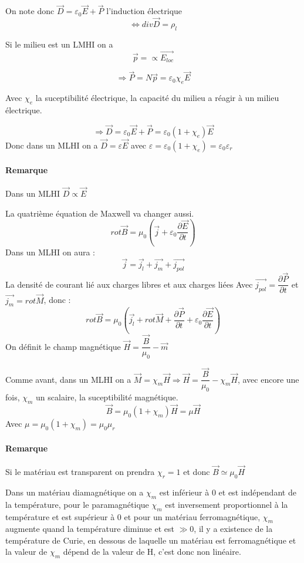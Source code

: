\documentclass[12pt,a4paper]{report}
\begin{document}
On note donc \(\vec{D} = \varepsilon_0 \vec{E} + \vec{P}\) l'induction électrique 
\[
	\Leftrightarrow div \vec{D} = \rho_l
\]

Si le milieu est un LMHI on a 
\[
	\vec{p} = \propto \vec{E_{loc}}
\]

\[
	\Rightarrow \vec{P} = N \vec{p} = \varepsilon_0 \chi_e \vec{E}
\]

Avec \(\chi_e\) la suceptibilité électrique, la capacité du milieu a réagir à un milieu électrique.

\[
	\Rightarrow \vec{D} = \varepsilon_0 \vec{E} + \vec{P} = \varepsilon_0 (1 + \chi_e) \vec{E}
\]
Donc dans un MLHI on a \(\vec{D} = \varepsilon \vec{E}\) avec \(\varepsilon = \varepsilon_0 (1+\chi_e) = \varepsilon_0 \varepsilon_r\)

\paragraph{Remarque} Dans un MLHI \(\vec{D} \propto \vec{E}\)

La quatrième équation de Maxwell va changer aussi.
\[
	rot \vec{B} = \mu_0 \left( \vec{j} + \varepsilon_0 \dfrac{\partial \vec{E}}{\partial t}\right)
\]
Dans un MLHI on aura :
\[
	\vec{j} = \vec{j_l} + \vec{j_m} + \vec{j_{pol}}
\]
La densité de courant lié aux charges libres et aux charges liées
Avec \(\vec{j_{pol}} = \dfrac{\partial \vec{P}}{\partial t}\) et \(\vec{j_m} = rot \vec{M}\), donc :
\[
	rot \vec{B} = \mu_0 \left( \vec{j_l} + rot \vec{M} + \dfrac{\partial \vec{P}}{\partial t} + \varepsilon_0 \dfrac{\partial \vec{E}}{\partial t}\right)
\]
On définit le champ magnétique \(\vec{H} = \dfrac{\vec{B}}{\mu_0} - \vec{m}\)

Comme avant, dans un MLHI on a \(\vec{M} = \chi_m \vec{H} \Rightarrow \vec{H} = \dfrac{\vec{B}}{\mu_0} - \chi_m \vec{H}\), avec encore une fois, \(\chi_m\) un scalaire, la suceptibilité magnétique.
\[
	\vec{B} = \mu_0 ( 1 + \chi_m) \vec{H} = \mu \vec{H}
\]
Avec \(\mu = \mu_0 ( 1 + \chi_m) = \mu_0 \mu_r\)

\paragraph{Remarque} Si le matériau est transparent on prendra \(\chi_r = 1\) et donc \(\vec{B} \simeq \mu_0 \vec{H}\)

Dans un matériau diamagnétique on a \(\chi_m\) est inférieur à 0 et est indépendant de la température, pour le paramagnétique \(\chi_m\) est inversement proportionnel à la température et est supérieur à 0 et pour un matériau ferromagnétique, \(\chi_m\) augmente quand la température diminue et est \(\gg 0\), il y a existence de la température de Curie, en dessous de laquelle un matériau est ferromagnétique et la valeur de \(\chi_m\) dépend de la valeur de H, c'est donc non linéaire.
\end{document}
